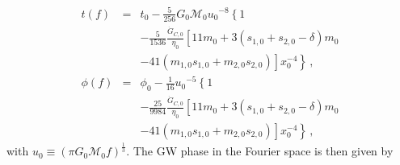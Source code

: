 \documentclass[prd,twocolumn,nofootinbib]{revtex4-1}
\newcommand\bw{\begin{widetext}}
\begin{document}
%
\allowdisplaybreaks
\begin{eqnarray}
t(f)&=&t_0 -\frac{5}{256}G_0 \mathcal{M}_0{u_0}^{-8}\left\{1 \right. \nonumber \\ 
&& \left. -\frac{5}{1536}\frac{\dot{G}_{C,0}}{\eta_0}\left[11m_0+3(s_{1,0}+s_{2,0}-\delta)m_0 \right. \right. \nonumber \\
&& \left. \left. -41 (m_{1,0}s_{1,0}+m_{2,0}s_{2,0})\right]x_0^{-4} \right\}\,, \\
\phi(f)&=&\phi_0  -\frac{1}{16}{u_0}^{-5}\left\{1  \right. \nonumber \\ 
&& \left.  -\frac{25}{9984}\frac{\dot{G}_{C,0}}{\eta_0}\left[11m_0+3(s_{1,0}+s_{2,0}-\delta)m_0 \right. \right. \nonumber \\
&& \left. \left. -41 (m_{1,0}s_{1,0}+m_{2,0}s_{2,0})\right]x_0^{-4} \right\}\,,
\end{eqnarray}
with $u_0 \equiv (\pi G_0 \mathcal{M}_0 f)^\frac{1}{3}$.
The GW phase in the Fourier space is then given by
\end{document}
